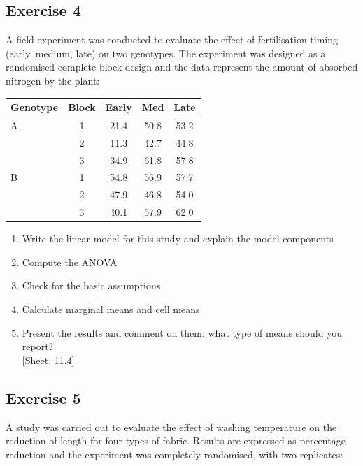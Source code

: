 \documentclass[a4paper,12pt,oneside]{book}
\providecommand{\tightlist}{%
  \setlength{\itemsep}{0pt}\setlength{\parskip}{0pt}}
\begin{document}
\hypertarget{exercise-4-4}{%
\subsection{Exercise 4}\label{exercise-4-4}}

A field experiment was conducted to evaluate the effect of fertilisation timing (early, medium, late) on two genotypes. The experiment was designed as a randomised complete block design and the data represent the amount of absorbed nitrogen by the plant:

\begin{longtable}[]{@{}lcccc@{}}
\toprule
Genotype & Block & Early & Med & Late \\
\midrule
\endhead
A & 1 & 21.4 & 50.8 & 53.2 \\
& 2 & 11.3 & 42.7 & 44.8 \\
& 3 & 34.9 & 61.8 & 57.8 \\
B & 1 & 54.8 & 56.9 & 57.7 \\
& 2 & 47.9 & 46.8 & 54.0 \\
& 3 & 40.1 & 57.9 & 62.0 \\
\bottomrule
\end{longtable}

\begin{enumerate}
\def\labelenumi{\arabic{enumi}.}
\tightlist
\item
  Write the linear model for this study and explain the model components
\item
  Compute the ANOVA
\item
  Check for the basic assumptions
\item
  Calculate marginal means and cell means
\item
  Present the results and comment on them: what type of means should you report?\\
  {[}Sheet: 11.4{]}
\end{enumerate}

\hypertarget{exercise-5-2}{%
\subsection{Exercise 5}\label{exercise-5-2}}

A study was carried out to evaluate the effect of washing temperature on the reduction of length for four types of fabric. Results are expressed as percentage reduction and the experiment was completely randomised, with two replicates:
\end{document}
